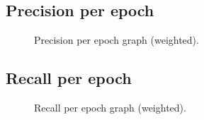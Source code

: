 \documentclass[a4paper,oneside,11pt]{book}
\begin{document}
\subsection{Precision per epoch}
\begin{figure}[H]
    \centering
    \caption{Precision per epoch graph (weighted).}
\end{figure}
\subsection{Recall per epoch}
\begin{figure}[H]
    \centering
    \caption{Recall per epoch graph (weighted).}
\end{figure}
\end{document}
